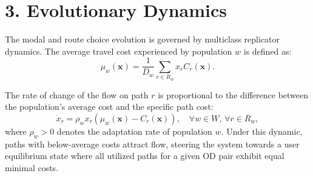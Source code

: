 \documentclass[12pt,a4paper]{article}
\begin{document}
\section*{3. Evolutionary Dynamics}
The modal and route choice evolution is governed by multiclass replicator dynamics. The average travel cost experienced by population $w$ is defined as:
\begin{equation}
    \mu_w(\mathbf{x}) = \frac{1}{D_w} \sum_{r \in R_w} x_r C_r(\mathbf{x}).
\end{equation}

The rate of change of the flow on path $r$ is proportional to the difference between the population's average cost and the specific path cost:
\begin{equation}
    \dot{x}_r = \rho_w x_r \left( \mu_w(\mathbf{x}) - C_r(\mathbf{x}) \right), \quad \forall w \in W, \, \forall r \in R_w,
\end{equation}
where $\rho_w > 0$ denotes the adaptation rate of population $w$. Under this dynamic, paths with below-average costs attract flow, steering the system towards a user equilibrium state where all utilized paths for a given OD pair exhibit equal minimal costs.
\end{document}
